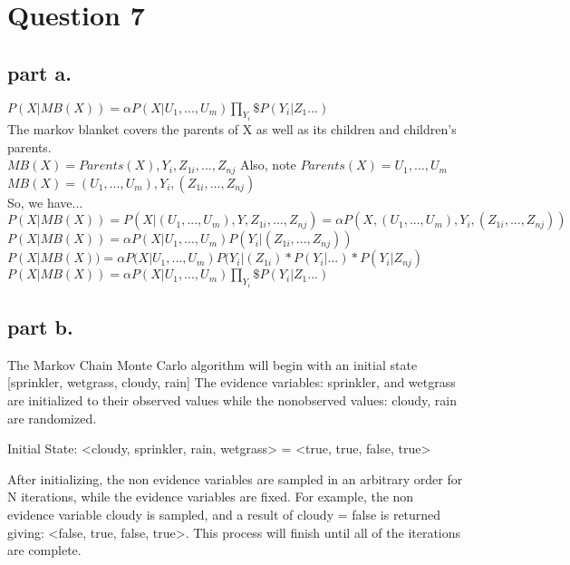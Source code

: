 \section{Question 7}

\subsection{part a.}

 $ P(X|MB(X)) = \alpha P(X|U_1,...,U_m)  \prod\limits_{Y_i}^{} \$ P(Y_i|Z_1...) $ \\
\noindent
The markov blanket covers the parents of X as well as its children and children's parents. \\
$ MB(X) =  Parents(X), Y_i, Z_{1i},...,Z_{nj} $  Also, note $ Parents(X) = U_1,...,U_m $\\
\noindent
$ MB(X) = (U_1,...,U_m), Y_i, (Z_{1i},...,Z_{nj}) $ \\

\noindent
So, we have... \\
$ P(X|MB(X)) = P(X | (U_1,...,U_m), Y, Z_{1i},...,Z_{nj}) = \alpha P(X,(U_1,...,U_m), Y_i, (Z_{1i},...,Z_{nj})) $ \\
\noindent
$ P(X|MB(X)) = \alpha P(X | U_1,...,U_m) P(Y_i | (Z_{1i},...,Z_{nj})) $ \\
$ P(X|MB(X)) = \alpha P(X | U_1,...,U_m) P(Y_i | (Z_{1i}) * P(Y_i |...) * P(Y_i | Z_{nj})$ \\
$ P(X|MB(X)) = \alpha P(X|U_1,...,U_m)  \prod\limits_{Y_i}^{} \$ P(Y_i|Z_1...) $ \\

\subsection{part b.}

  The Markov Chain Monte Carlo algorithm will begin with an initial state [sprinkler, wetgrass, cloudy, rain]
  The evidence variables: sprinkler, and wetgrass are initialized to their observed values while the nonobserved values: cloudy, rain are
  randomized. \\ \noindent

  Initial State: <cloudy, sprinkler, rain, wetgrass> = <true, true, false, true> \\

  \noindent

  After initializing, the non evidence variables are sampled in an arbitrary order for N iterations, while the evidence variables are fixed.
  For example, the non evidence variable cloudy is sampled, and a result of cloudy = false is returned giving: <false, true, false, true>.
  This process will finish until all of the iterations are complete.

